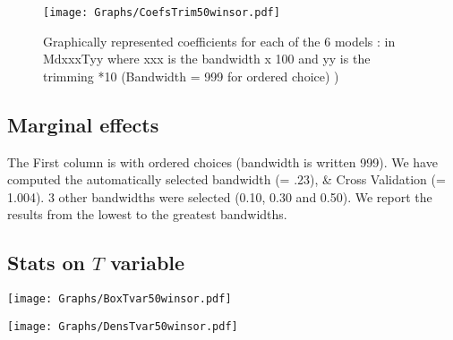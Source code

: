 \documentclass[a4paper]{article}
\begin{document}


\newpage

\begin{sidewaysfigure}[h!]
\caption{Graphically represented coefficients for each of the 6 models : in MdxxxTyy  where xxx is the bandwidth x 100 and yy is the trimming *10 (Bandwidth = 999 for ordered choice) )}\label{PlotFOK}
\texttt{[image: Graphs/CoefsTrim50winsor.pdf]}

\end{sidewaysfigure}
\clearpage

\subsection{Marginal effects}
%


The First column is with ordered choices (bandwidth is written 999). We  have computed the  automatically selected bandwidth  (= .23), \& Cross Validation (= 1.004). 3 other  bandwidths were selected (0.10, 0.30 and 0.50). We report the results from the lowest to the greatest bandwidths. \\
\newpage
\subsection{Stats on $T$ variable}



\texttt{[image: Graphs/BoxTvar50winsor.pdf]}


\texttt{[image: Graphs/DensTvar50winsor.pdf]}
\end{document}
